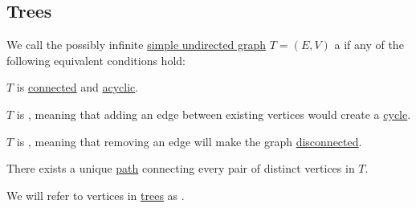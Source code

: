 \subsection{Trees}\label{subsec:trees}

\begin{definition}\label{def:tree}
  We call the possibly infinite \hyperref[def:undirected_graph]{simple undirected graph} \( T = (E, V) \) a  if any of the following equivalent conditions hold:
  \begin{thmenum}
     \( T \) is \hyperref[def:graph_connectedness/undirected]{connected} and \hyperref[def:acyclic_graph]{acyclic}.

     \( T \) is , meaning that adding an edge between existing vertices would create a \hyperref[def:graph_cycle]{cycle}.

     \( T \) is , meaning that removing an edge will make the graph \hyperref[def:graph_connectedness/undirected]{disconnected}.

     There exists a unique \hyperref[def:graph_walk/path]{path} connecting every pair of distinct vertices in \( T \).
  \end{thmenum}
\end{definition}
\begin{comments}
  \item We will refer to vertices in \hyperref[def:tree]{trees} as .
\end{comments}
